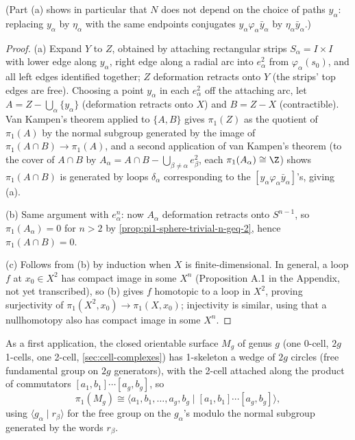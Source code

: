 (Part (a) shows in particular that $N$ does not depend on the choice of paths
$y_\alpha$: replacing $y_\alpha$ by $\eta_\alpha$ with the same endpoints conjugates
$y_\alpha\varphi_\alpha\bar y_\alpha$ by $\eta_\alpha\bar y_\alpha$.)

\begin{proof}
(a) Expand $Y$ to $Z$, obtained by attaching rectangular strips $S_\alpha=I\times I$ with
lower edge along $y_\alpha$, right edge along a radial arc into $e_\alpha^2$ from $\varphi_\alpha(s_0)$, and
all left edges identified together; $Z$ deformation retracts onto $Y$ (the strips' top
edges are free). Choosing a point $y_\alpha$ in each $e_\alpha^2$ off the attaching arc, let
$A = Z-\bigcup_\alpha\{y_\alpha\}$ (deformation retracts onto $X$) and $B = Z-X$
(contractible). Van Kampen's theorem applied to $\{A,B\}$ gives $\pi_1(Z)$ as the
quotient of $\pi_1(A)$ by the normal subgroup generated by the image of
$\pi_1(A\cap B)\to\pi_1(A)$, and a second application of van Kampen's theorem (to the
cover of $A\cap B$ by $A_\alpha = A\cap B - \bigcup_{\beta\ne\alpha}e_\beta^2$, each $\pi_1(A_\alpha)\cong\Z$) shows
$\pi_1(A\cap B)$ is generated by loops $\delta_\alpha$ corresponding to the
$[y_\alpha\varphi_\alpha\bar y_\alpha]$'s, giving (a).

(b) Same argument with $e_\alpha^n$: now $A_\alpha$ deformation retracts onto $S^{n-1}$, so
$\pi_1(A_\alpha)=0$ for $n>2$ by \cref{prop:pi1-sphere-trivial-n-geq-2}, hence $\pi_1(A\cap B)=0$.

(c) Follows from (b) by induction when $X$ is finite-dimensional. In general, a loop
$f$ at $x_0\in X^2$ has compact image in some $X^n$ (Proposition A.1 in the
Appendix, not yet transcribed), so (b) gives $f$ homotopic to a loop in $X^2$,
proving surjectivity of $\pi_1(X^2,x_0)\to\pi_1(X,x_0)$; injectivity is similar, using
that a nullhomotopy also has compact image in some $X^n$.
\end{proof}



As a first application, the closed orientable surface $M_g$ of genus $g$ (one 0-cell,
$2g$ 1-cells, one 2-cell, \cref{sec:cell-complexes}) has 1-skeleton a wedge of $2g$ circles
(free fundamental group on $2g$ generators), with the 2-cell attached along the
product of commutators $[a_1,b_1]\cdots[a_g,b_g]$, so
\[
\pi_1(M_g) \cong \langle a_1,b_1,\ldots,a_g,b_g \mid [a_1,b_1]\cdots[a_g,b_g]\rangle,
\]
using $\langle g_\alpha \mid r_\beta\rangle$ for the free group on the $g_\alpha$'s modulo the normal
subgroup generated by the words $r_\beta$.

